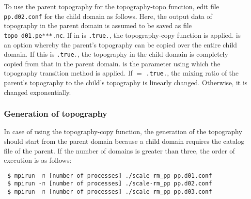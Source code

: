 To use the parent topography for the topography-topo function, edit file \verb|pp.d02.conf| for the child domain as follows.
Here, the output data of topography in the parent domain is assumed to be saved as file \verb|topo_d01.pe***.nc|.
If  in  is \verb|.true.|, the topography-copy function is applied.
 is an option whereby the parent’s topography can be copied over the entire child domain. If this is \verb|.true.|, the topography in the child domain is completely copied from that in the parent domain.  is the parameter using which the topography transition method is applied. If  $=$ \verb|.true.|, the mixing ratio of the parent’s topography to the child’s topography is linearly changed. Otherwise, it is changed exponentially.

\subsubsection{Generation of topography}
In case of using the topography-copy function, the generation of the topography should start from the parent domain  because a child domain requires the catalog  file of the parent. If the number of domains is greater than three, the order of execution is as follows:
\begin{verbatim}
 $ mpirun -n [number of processes] ./scale-rm_pp pp.d01.conf
 $ mpirun -n [number of processes] ./scale-rm_pp pp.d02.conf
 $ mpirun -n [number of processes] ./scale-rm_pp pp.d03.conf
\end{verbatim}


